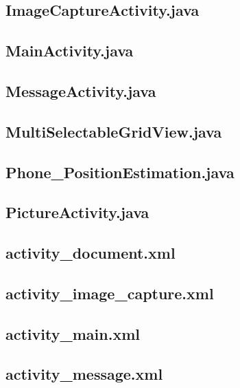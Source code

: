 \documentclass[11pt,a4j]{jarticle}
\begin{document}
\subsection{ImageCaptureActivity.java}
	
	\newpage
\subsection{MainActivity.java}
	
	\newpage
\subsection{MessageActivity.java}
	
	\newpage
\subsection{MultiSelectableGridView.java}
	
	\newpage
\subsection{Phone\_PositionEstimation.java}
	
	\newpage
\subsection{PictureActivity.java}
	
	\newpage

\subsection{activity\_document.xml}
	
	\newpage
\subsection{activity\_image\_capture.xml}
	
	\newpage
\subsection{activity\_main.xml}
	
	\newpage
\subsection{activity\_message.xml}
	
	\newpage
\end{document}
